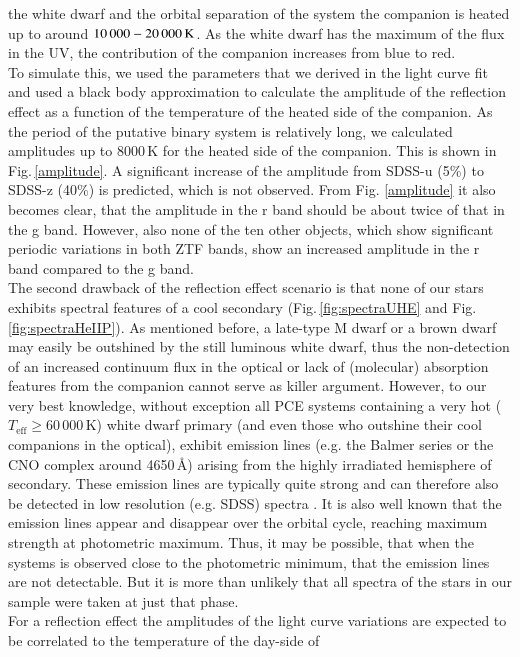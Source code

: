 \documentclass{aa}
\newcommand{\fg}[1]{\mbox{Fig.\,\ref{#1}}}
\newcommand{\Teff}{\mbox{$T_\mathrm{eff}$}\xspace}
\begin{document}
the white dwarf and the orbital separation of the system the companion is heated up to around
$10\,000-20\,000\,\rm K$. As the white dwarf has the maximum of the flux in the UV, the contribution of the
companion increases from blue to red.\\
To simulate this, we used the parameters that we derived in the light curve fit and used a black
body approximation to calculate the amplitude of the reflection effect as a
function of the temperature of the heated side of the companion. As the
period of the putative binary system is relatively long,
we calculated amplitudes up to 8000\,K for the heated side of the
companion. This is shown in Fig.\,\ref{amplitude}. A significant increase of
the amplitude from SDSS-u (5\%) to SDSS-z (40\%) is
predicted, which is not observed. From Fig. \ref{amplitude} it also becomes
clear, that the amplitude in the r band should be about twice of that in the g
band. However, also none of the ten other objects, which show significant periodic
variations in both ZTF bands, show an increased amplitude in the r band
compared to the g band.\\
The second drawback of the
reflection effect scenario is that none of our stars exhibits
spectral features of a cool secondary (\fg{fig:spectraUHE} and
\fg{fig:spectraHeIIP}). As mentioned before, a late-type M dwarf or a
brown dwarf may easily be outshined by the still luminous white dwarf,
thus the non-detection of an increased continuum flux in the optical or
lack of (molecular) absorption features from the companion cannot serve
as killer argument. However, to our
very best knowledge, without exception all PCE systems containing
a very hot (\Teff$\geq60\,000$\,K) white dwarf primary (and even those who
outshine their cool companions in the optical), exhibit emission
lines (e.g. the Balmer series or the CNO complex around 4650\,\AA)
arising from the highly irradiated hemisphere of secondary. These emission lines
are typically quite strong and can therefore also be detected in low
resolution (e.g. SDSS) spectra \citep{Nagel+2006, Nebot+2011}. It is also
well known that the emission lines appear and disappear over the orbital
cycle, reaching maximum strength at photometric maximum. Thus, it may be
possible, that when the systems is observed close to the photometric
minimum, that the emission lines are not detectable. But it is more than
unlikely that all spectra of the stars in our sample were taken at just
that phase.\\
For a reflection effect the amplitudes of the light curve
variations are expected to be correlated to the temperature of the day-side of
\end{document}
